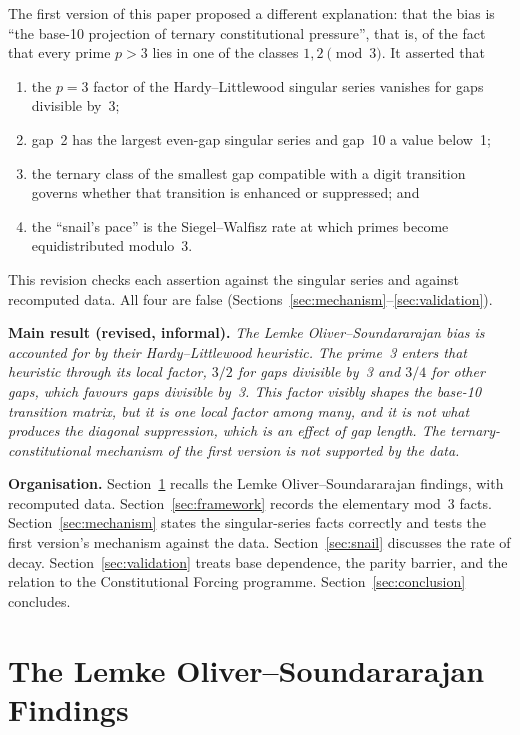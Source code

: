 \documentclass[12pt,a4paper]{article}
\theoremstyle{plain}
\theoremstyle{definition}
\theoremstyle{remark}
\begin{document}
The first version of this paper proposed a different explanation: that the bias is
``the base-10 projection of ternary constitutional pressure'', that is, of the fact that
every prime $p > 3$ lies in one of the classes $1, 2 \pmod 3$. It asserted that
\begin{enumerate}[label=(\roman*)]
  \item the $p = 3$ factor of the Hardy--Littlewood singular series vanishes for gaps
    divisible by~3;
  \item gap~2 has the largest even-gap singular series and gap~10 a value below~1;
  \item the ternary class of the smallest gap compatible with a digit transition governs
    whether that transition is enhanced or suppressed; and
  \item the ``snail's pace'' is the Siegel--Walfi{}sz rate at which primes become
    equidistributed modulo~3.
\end{enumerate}
This revision checks each assertion against the singular series and against recomputed
data. All four are false (Sections~\ref{sec:mechanism}--\ref{sec:validation}).

\medskip
\noindent\textbf{Main result (revised, informal).} \emph{The Lemke Oliver--Soundararajan
bias is accounted for by their Hardy--Littlewood heuristic. The prime~3 enters that
heuristic through its local factor, $3/2$ for gaps divisible by~3 and $3/4$ for other gaps,
which favours gaps divisible by~3. This factor visibly shapes the base-10 transition
matrix, but it is one local factor among many, and it is not what produces the diagonal
suppression, which is an effect of gap length. The
ternary-constitutional mechanism of the first version is not supported by the data.}

\medskip
\noindent\textbf{Organisation.} Section~\ref{sec:findings} recalls the Lemke
Oliver--Soundararajan findings, with recomputed data. Section~\ref{sec:framework} records
the elementary mod~3 facts. Section~\ref{sec:mechanism} states the singular-series facts
correctly and tests the first version's mechanism against the data.
Section~\ref{sec:snail} discusses the rate of decay. Section~\ref{sec:validation} treats base
dependence, the parity barrier, and the relation to the Constitutional Forcing programme.
Section~\ref{sec:conclusion} concludes.

\section{The Lemke Oliver--Soundararajan Findings}
\label{sec:findings}
\end{document}
